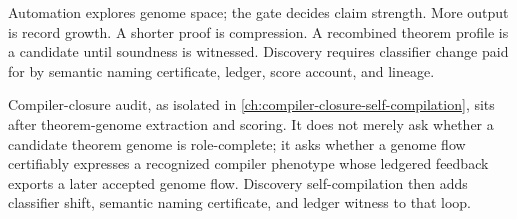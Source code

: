 \begin{principle}
\label{prin:automated-discovery-principle}
Automation explores genome space; the gate decides claim strength. More output
is record growth. A shorter proof is compression. A recombined theorem profile
is a candidate until soundness is witnessed. Discovery requires classifier
change paid for by semantic naming certificate, ledger, score account, and
lineage.
\end{principle}

\begin{principle}
\label{prin:automated-discovery-compiler-closure-placement}
Compiler-closure audit, as isolated in
\autoref{ch:compiler-closure-self-compilation}, sits after theorem-genome
extraction and scoring. It does not merely ask whether a candidate theorem
genome is role-complete; it asks whether a genome flow certifiably expresses a
recognized compiler phenotype whose ledgered feedback exports a later accepted
genome flow. Discovery self-compilation then adds classifier shift, semantic
naming certificate, and ledger witness to that loop.
\end{principle}

